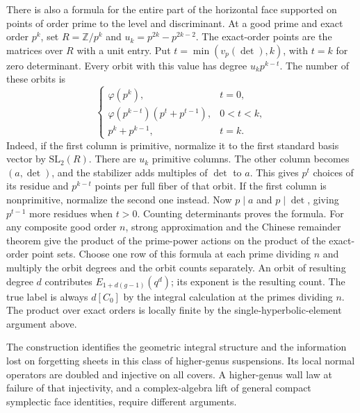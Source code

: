 There is also a formula for the entire part of the horizontal face supported on points of order prime to the level and discriminant. At a good prime and exact order \(p^k\), set \(R=\mathbb Z/p^k\) and \(u_k=p^{2k}-p^{2k-2}\). The exact-order points are the matrices over \(R\) with a unit entry. Put \(t=\min(v_p(\det),k)\), with \(t=k\) for zero determinant. Every orbit with this value has degree \(u_k p^{k-t}\). The number of these orbits is
\[\begin{cases}
  \varphi(p^k), &t=0,\\
  \varphi(p^{k-t})(p^t+p^{t-1}), &0<t<k,\\
  p^k+p^{k-1}, &t=k .
 \end{cases}\]
Indeed, if the first column is primitive, normalize it to the first standard basis vector by \(\mathrm{SL}_2(R)\). There are \(u_k\) primitive columns. The other column becomes \((a,\det)\), and the stabilizer adds multiples of \(\det\) to \(a\). This gives \(p^t\) choices of its residue and \(p^{k-t}\) points per full fiber of that orbit. If the first column is nonprimitive, normalize the second one instead. Now \(p\mid a\) and \(p\mid\det\), giving \(p^{t-1}\) more residues when \(t>0\). Counting determinants proves the formula. For any composite good order \(n\), strong approximation and the Chinese remainder theorem give the product of the prime-power actions on the product of the exact-order point sets. Choose one row of this formula at each prime dividing \(n\) and multiply the orbit degrees and the orbit counts separately. An orbit of resulting degree \(d\) contributes \(E_{1+d(g-1)}(q^d)\); its exponent is the resulting count. The true label is always \(d[C_0]\) by the integral calculation at the primes dividing \(n\). The product over exact orders is locally finite by the single-hyperbolic-element argument above.

The construction identifies the geometric integral structure and the information lost on forgetting sheets in this class of higher-genus suspensions. Its local normal operators are doubled and injective on all covers. A higher-genus wall law at failure of that injectivity, and a complex-algebra lift of general compact symplectic face identities, require different arguments.
